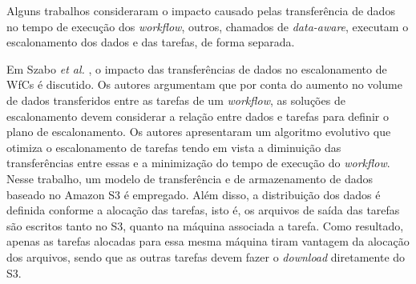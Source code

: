 Alguns trabalhos consideraram o impacto causado pelas transferência de dados no tempo de execução dos \textit{workflow}, outros, chamados de \textit{data-aware}, executam o escalonamento dos dados e das tarefas, de forma separada.

Em Szabo \textit{et al.} \cite{Szabo2013}, o impacto das transferências de dados no escalonamento de WfCs é discutido. Os autores argumentam que por conta do aumento no volume de dados transferidos entre as tarefas de um \textit{workflow}, as soluções de escalonamento devem considerar a relação entre dados e tarefas para definir o plano de escalonamento. Os autores apresentaram um algoritmo evolutivo que otimiza o escalonamento de tarefas tendo em vista a diminuição das transferências  entre essas e a minimização do tempo de execução do \textit{workflow}. Nesse trabalho, um modelo de transferência e de armazenamento de dados baseado no Amazon S3 é empregado. Além disso, a distribuição dos dados é definida conforme a  alocação das tarefas, isto é, os arquivos de saída das tarefas são escritos tanto no S3, quanto na máquina associada a tarefa. Como resultado, apenas as tarefas alocadas para essa mesma máquina tiram vantagem da alocação dos arquivos, sendo que as outras tarefas devem fazer o \textit{download} diretamente do S3. 




